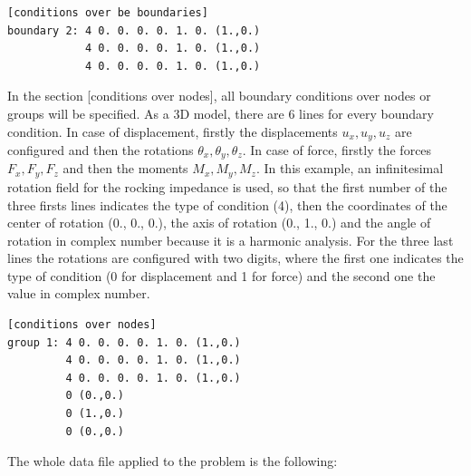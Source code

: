 \documentclass[a4]{article}
\begin{document}
\begin{Verbatim}
[conditions over be boundaries]
boundary 2: 4 0. 0. 0. 0. 1. 0. (1.,0.)
            4 0. 0. 0. 0. 1. 0. (1.,0.)
            4 0. 0. 0. 0. 1. 0. (1.,0.)
\end{Verbatim}

In the section [conditions over nodes], all boundary conditions over nodes or groups will be specified. As a 3D model, there are 6 lines for every boundary condition. In case of displacement, firstly the displacements $u_x, u_y, u_z$ are configured and then the rotations $\theta_x, \theta_y, \theta_z$. In case of force, firstly the forces $F_x, F_y, F_z$ and then the moments $M_x, M_y, M_z$. In this example, an infinitesimal rotation field for the rocking impedance is used, so that the first number of the three firsts lines indicates the type of condition (4), then the coordinates of the center of rotation (0., 0., 0.), the axis of rotation (0., 1., 0.) and the angle of rotation in complex number because it is a harmonic analysis. For the three last lines the rotations are configured with two digits, where the
first one indicates the type of condition (0 for displacement and 1 for force) and the second one the value in complex number.

\begin{Verbatim}	
[conditions over nodes]
group 1: 4 0. 0. 0. 0. 1. 0. (1.,0.)
         4 0. 0. 0. 0. 1. 0. (1.,0.)
         4 0. 0. 0. 0. 1. 0. (1.,0.)
         0 (0.,0.)
         0 (1.,0.)
         0 (0.,0.)
\end{Verbatim}

The whole data file applied to the problem is the following:
\end{document}
